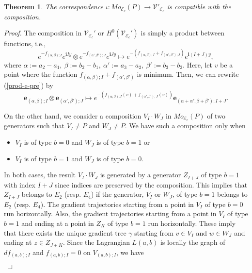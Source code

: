 \documentclass[12pt,reqno]{amsart}
\newcommand{\ii}{{\mathbf{i}}}
\newcommand{\ee}{{\mathbf{e}}}
\newcommand{\cE}{{\mathcal{E}}}
\newcommand{\cV}{{\mathcal{V}}}
\newtheorem{thm}{Theorem}[section]
\theoremstyle{definition}
\begin{document}
\begin{thm}
The correspondence $\iota : Mo_{\cE_c}(P)\to \cV'_{\cE_c}$ is compatible with the composition. 
\end{thm}
\begin{proof}
The composition in $\cV_{\cE_c}'$ or $H^0(\cV_{\cE_c}')$ is simply a product between functions, i.e.,
\begin{equation}\label{prod-e-pre}
e^{-f_{(\alpha,\beta);I}}e^{\ii Iy} \otimes e^{-f_{(\alpha',\beta');J}}e^{\ii Jy} \longmapsto e^{-\left(f_{(\alpha,\beta);I}+f_{(\alpha',\beta');J}\right)}e^{\ii (I+J)y},
\end{equation}
where $\alpha:=a_2-a_1,\ \beta:=b_2-b_1,\ \alpha':=a_3-a_2,\ \beta':=b_3-b_2$.
Here, let $v$ be a point where the function $f_{(\alpha,\beta);I}+f_{(\alpha',\beta')}$ is minimum. Then, we can rewrite (\ref{prod-e-pre}) by \begin{equation}\label{prod-e}
\ee_{(\alpha,\beta);I} \otimes \ee_{(\alpha',\beta');J} \mapsto e^{-\left(f_{(\alpha,\beta);I}(v) + f_{(\alpha',\beta');J}(v)\right)}\ee_{(\alpha+\alpha',\beta+\beta');I+J}.
\end{equation}\par
On the other hand, we consider a composition $V_I\cdot W_J$ in $Mo_{\cE_c}(P)$ of two generators such that $V_I \neq P$ and $W_J\neq P$. We have such a composition only when
\begin{itemize}
\item $V_I$ is of type $b=0$ and $W_J$ is of type $b=1$ or
\item $V_I$ is of type $b=1$ and $W_J$ is of type $b=0$.
\end{itemize}
In both cases, the result $V_I\cdot W_J$ is generated by a generator $Z_{I+J}$ of type $b = 1$ with index $I + J$ since indices are preserved by the composition. This implies that $Z_{I+J}$ belongs to $E_2$ (resp. $E_4$) if the generator, $V_I$ or $W_J$, of type $b = 1$ belongs to $E_2$ (resp. $E_4$). The gradient trajectories starting from a point in $V_{I}$ of type $b=0$ run horizontally. Also, the gradient trajectories starting from a point in $V_{I}$ of type $b=1$ and ending at a point in $Z_K$ of type $b=1$ run horizontally. These imply that there exists the unique gradient tree $\gamma$ starting from $v\in V_I$ and $w\in W_J$ and ending at $z\in Z_{J+K}$. Since the Lagrangian $L(a,b)$ is locally the graph of $df_{(a,b);I}$ and $f_{(a,b);I}=0$ on $V_{(a,b);I}$, we have
\begin{equation}
\begin{split}\label{m-comp}

\end{split}
\end{equation}
\end{proof}
\end{document}

